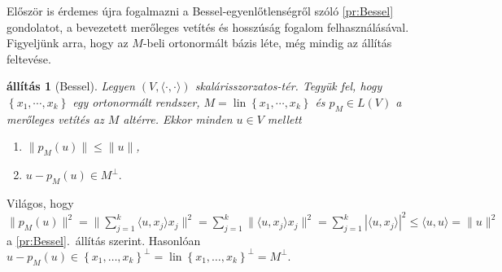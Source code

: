 \documentclass[9pt, a4paper, showtrims]{memoir}
\makeatletter
\renewenvironment{proof}[1][\proofname]
    {\par\pushQED{\qed}%
    \normalfont \topsep6\p@\@plus6\p@\relax
    \trivlist
    \item[\hskip\labelsep
        \itshape
    #1\@addpunct{:}]\ignorespaces}
    {\popQED\endtrivlist\@endpefalse}
\theoremstyle{plain}
\newtheorem{proposition}{állítás}[chapter]
\theoremstyle{remark}
\theoremstyle{definition}
\DeclareMathOperator{\lin}{lin}
\newcommand{\ip}[2]{\langle#1,#2\rangle}
\makeatother
\begin{document}
Először is érdemes újra fogalmazni a Bessel-egyenlőtlenségről szóló \ref{pr:Bessel} gondolatot, 
a bevezetett merőleges vetítés és hosszúság fogalom felhasználásával.
Figyeljünk arra, hogy az $M$-beli ortonormált bázis léte, még mindig az állítás feltevése.
\begin{proposition}[Bessel]\label{pr:Bessel2}
    Legyen $\left( V,\ip{\cdot}{\cdot} \right)$ skalárisszorzatos-tér.
    Tegyük fel, hogy $\left\{ x_1,\cdots,x_k \right\}$ egy ortonormált rendszer,
    $M=\lin\left\{ x_1,\cdots,x_k \right\}$
    és $p_M\in L\left( V \right)$ a merőleges vetítés az $M$ altérre.
    Ekkor minden $u\in V$ mellett
    \begin{enumerate}
        \item
            $\|p_M\left( u \right)\|\leq\|u\|$,
        \item
            \(
            u-p_M(u)\in M^\perp.
            \) 
            \qedhere
    \end{enumerate}
\end{proposition}
\begin{proof}
    Világos, hogy 
    $
    \|p_M\left( u \right)\|^2
    =
    \|\sum_{j=1}^k\ip{u}{x_j}x_j\|^2
    =
    \sum_{j=1}^k\|\ip{u}{x_j}x_j\|^2
    =
    \sum_{j=1}^k|\ip{u}{x_j}|^2
    \leq
    \ip{u}{u}
    =
    \|u\|^2
    $
    a \ref{pr:Bessel}.~állítás szerint.
    Hasonlóan 
    $
    u-p_M\left( u \right)\in \left\{ x_1,\dots,x_k \right\}^\perp
    =
    \lin\left\{ x_1,\dots,x_k \right\}^\perp
    =
    M^\perp.
    $
\end{proof}
\end{document}

